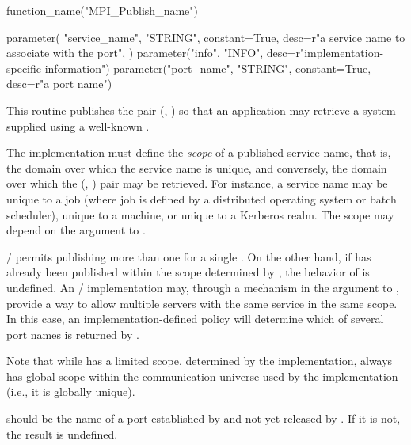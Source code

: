 %
\begin{mpi-binding}
    function_name("MPI_Publish_name")

    parameter(
        "service_name",
        "STRING",
        constant=True,
        desc=r"a service name to associate with the port",
    )
    parameter("info", "INFO", desc=r"implementation-specific information")
    parameter("port_name", "STRING", constant=True, desc=r"a port name")
\end{mpi-binding}

This routine publishes the pair (,
) so that an application may retrieve a
system-supplied  using a well-known
.

The implementation must define the \emph{scope} of a published service name,
that is, the domain over which the
service name is unique, and conversely, the domain over which the
(, ) pair may be retrieved.  For instance, a
service name may be unique to a job  (where job is defined by a
distributed operating system or batch scheduler), unique to a machine,
or unique to a Kerberos realm.
The scope may depend on the  argument to .


\MPI/ permits publishing  more than one 
for a single .  On the other hand,
if  has already been published
within the scope determined by , the behavior of 
is undefined. An \MPI/ implementation may, through a mechanism in
the  argument
to ,  provide a way to allow
multiple servers with the same service in the same
scope. In this case, an implementation-defined policy will
determine which of several port names is returned by .



Note that while  has a limited
scope, determined by the implementation, 
always has global scope within the communication universe used
by the implementation (i.e., it is globally unique).

 should be the name of a port established
by  and not yet
released by
. If it is not, the result is undefined.


